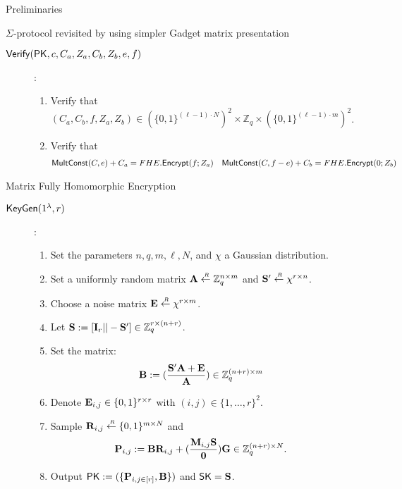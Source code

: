 \begin{section}{Preliminaries}
\begin{subsection}{$\Sigma$-protocol revisited by using simpler Gadget matrix presentation}
\begin{description}
    \item[${\mathsf{Verify}}(\mathsf{PK}, c, C_a, Z_a, C_b, Z_b, e, f)$]:
      \begin{enumerate}
      \item Verify that $(C_a, C_b, f, Z_a, Z_b) \in (\{0,1\}^{(\ell-1) \cdot N})^2 \times \mathbb{Z}_q \times (\{0,1\}^{(\ell-1)\cdot m})^2$.
      \item Verify that
        \begin{align*}
          {\mathsf{MultConst}}(C, e)+C_a &= FHE.{\mathsf{Encrypt}}(f; Z_a) & {\mathsf{MultConst}}(C, f-e) + C_b &= FHE.{\mathsf{Encrypt}}(0; Z_b)
        \end{align*}
      \end{enumerate}
    \end{description}
  \end{subsection}


  \begin{subsection}{Matrix Fully Homomorphic Encryption~\cite{DBLP:conf/pkc/HiromasaAO15}}
    \begin{description}
    \item[${\mathsf{KeyGen}} (1^\lambda, r)$]:
      \begin{enumerate}
      \item Set the parameters $n, q, m, \ell, N$, and $\chi$ a Gaussian distribution.
      \item Set a uniformly random matrix $\mathbf{A} \stackrel{{\scriptscriptstyle \mkern4mu R}}{\gets} \mathbb{Z}_q^{n \times m}$ and $\mathbf{S'} \stackrel{{\scriptscriptstyle \mkern4mu R}}{\gets} \chi^{r \times n}$.
      \item Choose a noise matrix $\mathbf{E} \stackrel{{\scriptscriptstyle \mkern4mu R}}{\gets} \chi^{r \times m}$.
      \item Let $\mathbf{S}:= [\mathbf{I}_r || - \mathbf{S}'] \in \mathbb{Z}_q^{r \times (n+r)}$.
      \item Set the matrix:
        \begin{align*}
          \mathbf{B} &:= (\frac{\mathbf{S}'\mathbf{A} + \mathbf{E}}{\mathbf{A}}) \in \mathbb{Z}_q^{(n+r) \times m}
        \end{align*}
      \item Denote $\mathbf{E}_{i,j} \in \{0, 1\}^{r\times r}$ with $(i,j) \in \{1, \dots ,r\}^2$.
      \item Sample $\mathbf{R}_{i,j} \stackrel{{\scriptscriptstyle \mkern4mu R}}{\gets} \{0,1\}^{m \times N}$ and
        \begin{align*}
          \mathbf{P}_{i,j} &:= \mathbf{B} \mathbf{R}_{i,j} + (\frac{\mathbf{M}_{i,j}\mathbf{S}}{\mathbf{0}}) \mathbf{G} \in \mathbb{Z}_q^{(n+r) \times N}.
        \end{align*}
      \item Output $\mathsf{PK} := (\{\mathbf{P}_{i,j \in [r]}, \mathbf{B}\})$ and $\mathsf{SK} = \mathbf{S}$.
      \end{enumerate}


\end{description}
\end{subsection}
\end{section}
